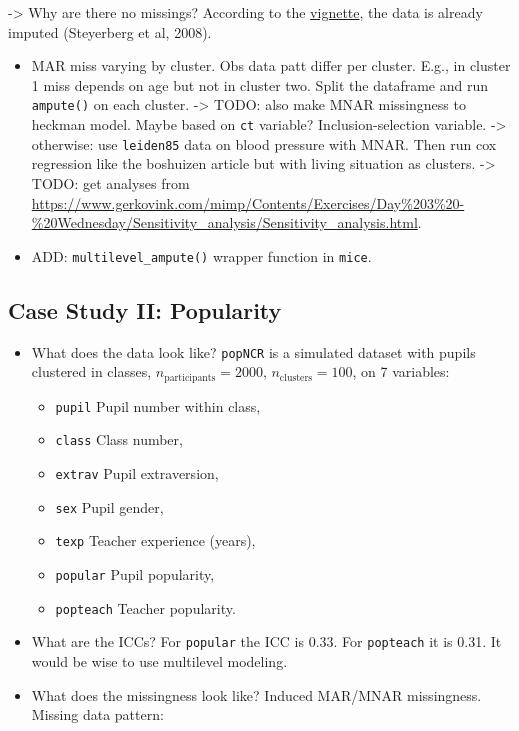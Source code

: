 \documentclass[
]{jss}
\providecommand{\tightlist}{%
  \setlength{\itemsep}{0pt}\setlength{\parskip}{0pt}}
\begin{document}
-\textgreater{} Why are there no missings? According to the
\href{https://cran.r-project.org/web/packages/metamisc/metamisc.pdf}{vignette},
the data is already imputed (Steyerberg et al, 2008).

\begin{itemize}
\item
  MAR miss varying by cluster. Obs data patt differ per cluster. E.g.,
  in cluster 1 miss depends on age but not in cluster two. Split the
  dataframe and run \texttt{ampute()} on each cluster. -\textgreater{}
  TODO: also make MNAR missingness to heckman model. Maybe based on
  \texttt{ct} variable? Inclusion-selection variable. -\textgreater{}
  otherwise: use \texttt{leiden85} data on blood pressure with MNAR.
  Then run cox regression like the boshuizen article but with living
  situation as clusters. -\textgreater{} TODO: get analyses from
  \url{https://www.gerkovink.com/mimp/Contents/Exercises/Day\%203\%20-\%20Wednesday/Sensitivity_analysis/Sensitivity_analysis.html}.
\item
  ADD: \texttt{multilevel\_ampute()} wrapper function in \texttt{mice}.
\end{itemize}

\hypertarget{case-study-ii-popularity}{%
\subsection{Case Study II: Popularity}\label{case-study-ii-popularity}}

\begin{itemize}
\item
  What does the data look like? \texttt{popNCR} is a simulated dataset
  with pupils clustered in classes, \(n_{\text{participants}} = 2000\),
  \(n_{\text{clusters}} = 100\), on 7 variables:

  \begin{itemize}
  \tightlist
  \item
    \texttt{pupil} Pupil number within class,
  \item
    \texttt{class} Class number,
  \item
    \texttt{extrav} Pupil extraversion,
  \item
    \texttt{sex} Pupil gender,
  \item
    \texttt{texp} Teacher experience (years),
  \item
    \texttt{popular} Pupil popularity,
  \item
    \texttt{popteach} Teacher popularity.
  \end{itemize}
\item
  What are the ICCs? For \texttt{popular} the ICC is 0.33. For
  \texttt{popteach} it is 0.31. It would be wise to use multilevel
  modeling.
\item
  What does the missingness look like? Induced MAR/MNAR missingness.
  Missing data pattern:
\end{itemize}
\end{document}
